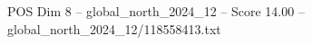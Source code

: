 \begin{textsample}{POS Dim 8 – global\_north\_2024\_12 – Score 14.00 – global\_north\_2024\_12/118558413.txt}
\end{textsample}

